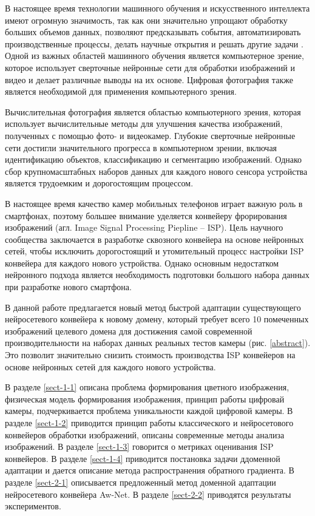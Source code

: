 
В настоящее время технологии машинного обучения и искусственного интеллекта имеют огромную значимость, так как они значительно упрощают обработку больших объемов данных, позволяют предсказывать события, автоматизировать производственные процессы, делать научные открытия и решать другие задачи \cite{lib-sidorenko}. Одной из важных областей машинного обучения является компьютерное зрение, которое использует сверточные нейронные сети для обработки изображений и видео и делает различные выводы на их основе. Цифровая фотография также является необходимой для применения компьютерного зрения.

Вычислительная фотография является областью компьютерного зрения, которая использует вычислительные методы для улучшения качества изображений, полученных с помощью фото- и видеокамер. Глубокие сверточные нейронные сети достигли значительного прогресса в компьютерном зрении, включая идентификацию объектов, классификацию и сегментацию изображений. Однако сбор крупномасштабных наборов данных для каждого нового сенсора устройства является трудоемким и дорогостоящим процессом.

В настоящее время качество камер мобильных телефонов играет важную роль в смартфонах, поэтому большее внимание уделяется конвейеру фрорирования изображений (агл. Image Signal Processing Piepline -- ISP). Цель научного сообщества заключается в разработке сквозного конвейера на основе нейронных сетей, чтобы исключить дорогостоящий и утомительный процесс настройки ISP конвейера для каждого нового устройства. Однако основным недостатком нейронного подхода является необходимость подготовки большого набора данных при разработке нового смартфона.


В данной работе предлагается новый метод быстрой адаптации существующего нейросетевого конвейера к новому домену, который требует всего 10 помеченных изображений целевого домена для достижения самой современной производительности на наборах данных реальных тестов камеры (рис. \ref{abstract}). Это позволит значительно снизить стоимость производства ISP конвейеров на основе нейронных сетей для каждого нового устройства.

В разделе \ref{sect-1-1} описана проблема формирования цветного изображения, физическая модель формирования изображения, принцип работы цифровай камеры, подчеркивается проблема уникальности каждой цифровой камеры. В разделе \ref{sect-1-2} приводится принцип работы классического и нейросетового конвейеров обработки изображений, описаны современные методы анализа изображений. В разделе \ref{sect-1-3} говорится о метриках оценивания ISP конвейеров. В разделе \ref{sect-1-4} приводится постановка задачи ддоменной адаптации и дается описание метода распространения обратного градиента. В разделе \ref{sect-2-1} описывается предложенный метод доменной адаптации нейросетевого конвейера Aw-Net. В разделе \ref{sect-2-2} приводятся результаты экспериментов.

\clearpage